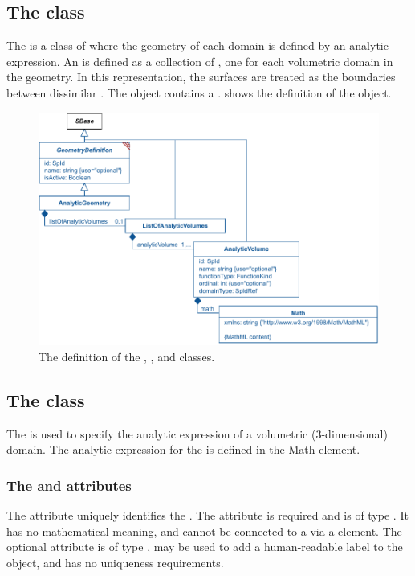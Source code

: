 \subsection{The  class}
\label{analyticgeometry-class}
\label{listofanalyticvolumes-class}
The \AnalyticGeometry is a class of \GeometryDefinition where the geometry of each domain is defined by an analytic expression. An \AnalyticGeometry is defined as a collection of \AnalyticVolumes, one \AnalyticVolume for each volumetric domain in the geometry. In this representation, the surfaces are treated as the boundaries between dissimilar \AnalyticVolumes. The \AnalyticGeometry object contains a \ListOfAnalyticVolumes.  shows the definition of the \AnalyticGeometry object.

\begin{figure}[ht]
  \includegraphics{figs/AnalyticGeometry-uml}
  \caption{The definition of the \AnalyticGeometry, \ListOfAnalyticVolumes, and \AnalyticVolume classes.}
  \label{AnalyticGeometry-uml}
  \label{ListOfAnalyticVolumes-uml}
  \label{AnalyticVolume-uml}
\end{figure}


\subsection{The  class}
\label{analyticvolume-class}
The \AnalyticVolume is used to specify the analytic expression of a volumetric (3-dimensional) domain. The analytic expression for the \AnalyticVolume is defined in the Math element.

\subsubsection{The \fixttspace{} and \fixttspace{} attributes}
The  attribute uniquely identifies the \AnalyticVolume. The attribute is required and is of type .  It has no mathematical meaning, and cannot be connected to a \Parameter via a \SpatialSymbolReference element.  The optional  attribute is of type , may be used to add a human-readable label to the object, and has no uniqueness requirements.

